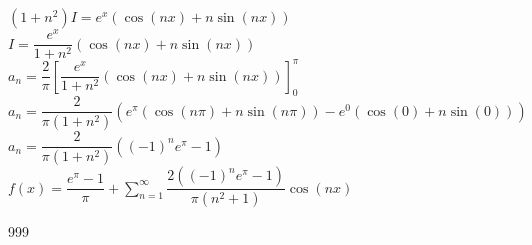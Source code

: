 \documentclass[a4paper]{article}
\begin{document}
$\left( 1 + n^2 \right) I = e^x \left( \cos(nx) + n \sin(nx) \right)$ \\

$I = \dfrac{e^x}{1 + n^2} \left( \cos(nx) + n \sin(nx) \right)$ \\

$a_n = \dfrac{2}{\pi} \left[ \dfrac{e^x}{1 + n^2} \left( \cos(nx) + n \sin(nx) \right) \right]_0^{\pi}$ \\

$a_n = \dfrac{2}{\pi \left( 1 + n^2 \right)} \left( e^{\pi} \left( \cos(n\pi) + n \sin(n\pi) \right) - e^0 \left( \cos(0) + n \sin(0) \right) \right)$ \\

$a_n = \dfrac{2}{\pi \left( 1 + n^2 \right)} \left( (-1)^n e^{\pi} - 1 \right)$ \\

$f(x) = \dfrac{e^{\pi} - 1}{\pi} + \displaystyle\sum_{n=1}^{\infty} \dfrac{2 \left( (-1)^n e^{\pi} - 1 \right)}{\pi \left( n^2 + 1 \right)} \cos(nx)$ \\

\begin{thebibliography}{999}
\end{thebibliography}
\end{document}
